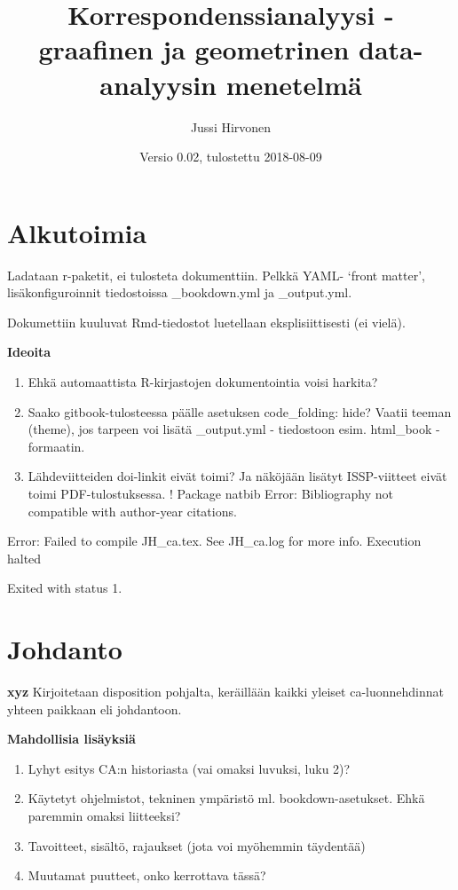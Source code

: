 \documentclass[finnish,]{book}
\title{Korrespondenssianalyysi - graafinen ja geometrinen data-analyysin
menetelmä}
\author{Jussi Hirvonen}
\date{Versio 0.02, tulostettu 2018-08-09}
\begin{document}
\maketitle

{
\setcounter{tocdepth}{1}
\tableofcontents
}
\hypertarget{alkutoimia}{%
\chapter*{Alkutoimia}\label{alkutoimia}}

Ladataan r-paketit, ei tulosteta dokumenttiin. Pelkkä YAML- `front
matter', lisäkonfiguroinnit tiedostoissa \_bookdown.yml ja \_output.yml.

Dokumettiin kuuluvat Rmd-tiedostot luetellaan eksplisiittisesti (ei
vielä).

\textbf{Ideoita}

\begin{enumerate}
\def\labelenumi{\arabic{enumi}.}
\item
  Ehkä automaattista R-kirjastojen dokumentointia voisi harkita?
\item
  Saako gitbook-tulosteessa päälle asetuksen code\_folding: hide? Vaatii
  teeman (theme), jos tarpeen voi lisätä \_output.yml - tiedostoon esim.
  html\_book - formaatin.
\item
  Lähdeviitteiden doi-linkit eivät toimi? Ja näköjään lisätyt
  ISSP-viitteet eivät toimi PDF-tulostuksessa. ! Package natbib Error:
  Bibliography not compatible with author-year citations.
\end{enumerate}

Error: Failed to compile JH\_ca.tex. See JH\_ca.log for more info.
Execution halted

Exited with status 1.

\hypertarget{johdanto}{%
\chapter{Johdanto}\label{johdanto}}

\textbf{xyz} Kirjoitetaan disposition pohjalta, keräillään kaikki
yleiset ca-luonnehdinnat yhteen paikkaan eli johdantoon.

\textbf{Mahdollisia lisäyksiä}

\begin{enumerate}
\def\labelenumi{\arabic{enumi}.}
\item
  Lyhyt esitys CA:n historiasta (vai omaksi luvuksi, luku 2)?
\item
  Käytetyt ohjelmistot, tekninen ympäristö ml. bookdown-asetukset. Ehkä
  paremmin omaksi liitteeksi?
\item
  Tavoitteet, sisältö, rajaukset (jota voi myöhemmin täydentää)
\item
  Muutamat puutteet, onko kerrottava tässä?
\end{enumerate}
\end{document}
